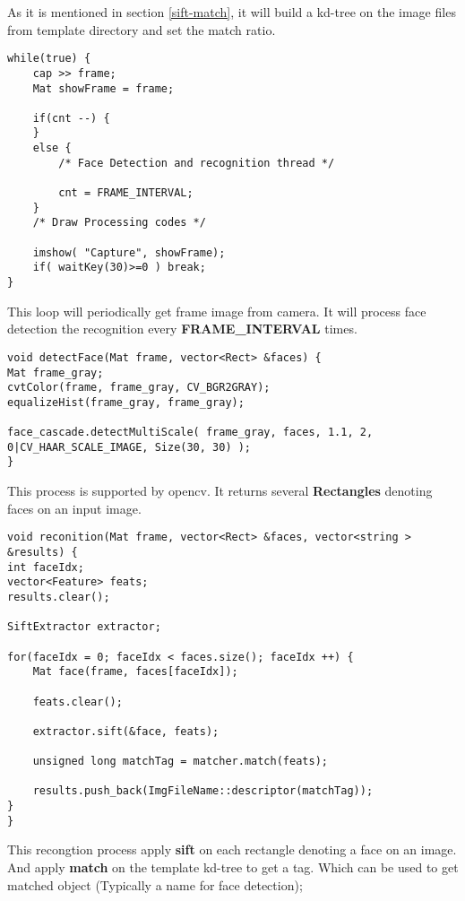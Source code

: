 \documentclass[paper=a4, fontsize=11pt]{scrartcl} %
\newcounter{subsubsubsection}[subsubsection]
\numberwithin{equation}{section} %
\numberwithin{figure}{section} %
\numberwithin{table}{section} %
\begin{document}
As it is mentioned in section \ref{sift-match}, it will build a kd-tree on the image files from template directory and set the match ratio.

\begin{lstlisting}
while(true) {
    cap >> frame;
    Mat showFrame = frame;

    if(cnt --) {
    }
    else {
        /* Face Detection and recognition thread */

        cnt = FRAME_INTERVAL;
    }
    /* Draw Processing codes */ 

    imshow( "Capture", showFrame);
    if( waitKey(30)>=0 ) break;
}
\end{lstlisting}

This loop will periodically get frame image from camera. It will process face detection the recognition every \textbf{FRAME\_INTERVAL} times.


\begin{lstlisting}
void detectFace(Mat frame, vector<Rect> &faces) {
Mat frame_gray;
cvtColor(frame, frame_gray, CV_BGR2GRAY);
equalizeHist(frame_gray, frame_gray);

face_cascade.detectMultiScale( frame_gray, faces, 1.1, 2, 0|CV_HAAR_SCALE_IMAGE, Size(30, 30) );
}
\end{lstlisting}

This process is supported by opencv. It returns several \textbf{Rectangles} denoting faces on an input image.


\begin{lstlisting}
void reconition(Mat frame, vector<Rect> &faces, vector<string > &results) {
int faceIdx;
vector<Feature> feats;
results.clear();

SiftExtractor extractor;

for(faceIdx = 0; faceIdx < faces.size(); faceIdx ++) {
    Mat face(frame, faces[faceIdx]);

    feats.clear();

    extractor.sift(&face, feats);

    unsigned long matchTag = matcher.match(feats);

    results.push_back(ImgFileName::descriptor(matchTag));
}
}
\end{lstlisting}

This recongtion process apply \textbf{sift} on each rectangle denoting a face on an image. And apply \textbf{match} on the template kd-tree to get a tag. Which can be used to get matched object (Typically a name for face detection);
\end{document}
